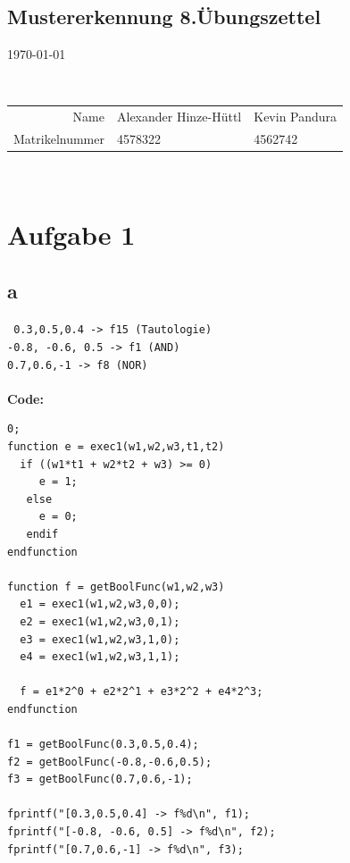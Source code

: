 \documentclass[a4paper,10pt]{article}
\begin{document}
\begin{center}
    \section*{Mustererkennung 8.Übungszettel}
     \today
\end{center}
$ $
\newline
\begin{tabular}{r|l l}
    Name & Alexander Hinze-Hüttl & Kevin Pandura\\
    Matrikelnummer & 4578322 & 4562742\\
\end{tabular}
\newline
$ $
\newline
\newline

\section*{Aufgabe 1}
\subsection*{a}
	\texttt{
0.3,0.5,0.4 -> f15 (Tautologie) \\
-0.8, -0.6, 0.5 -> f1 (AND)\\
0.7,0.6,-1 -> f8 (NOR)}\\
\\
\textbf{Code:}\\
	\begin{lstlisting}
0;
function e = exec1(w1,w2,w3,t1,t2)
  if ((w1*t1 + w2*t2 + w3) >= 0)
     e = 1;
   else
     e = 0;
   endif
endfunction

function f = getBoolFunc(w1,w2,w3)
  e1 = exec1(w1,w2,w3,0,0);
  e2 = exec1(w1,w2,w3,0,1);
  e3 = exec1(w1,w2,w3,1,0);
  e4 = exec1(w1,w2,w3,1,1);
  
  f = e1*2^0 + e2*2^1 + e3*2^2 + e4*2^3;
endfunction

f1 = getBoolFunc(0.3,0.5,0.4);
f2 = getBoolFunc(-0.8,-0.6,0.5);
f3 = getBoolFunc(0.7,0.6,-1);

fprintf("[0.3,0.5,0.4] -> f%d\n", f1);
fprintf("[-0.8, -0.6, 0.5] -> f%d\n", f2);
fprintf("[0.7,0.6,-1] -> f%d\n", f3);
	\end{lstlisting}
\end{document}
